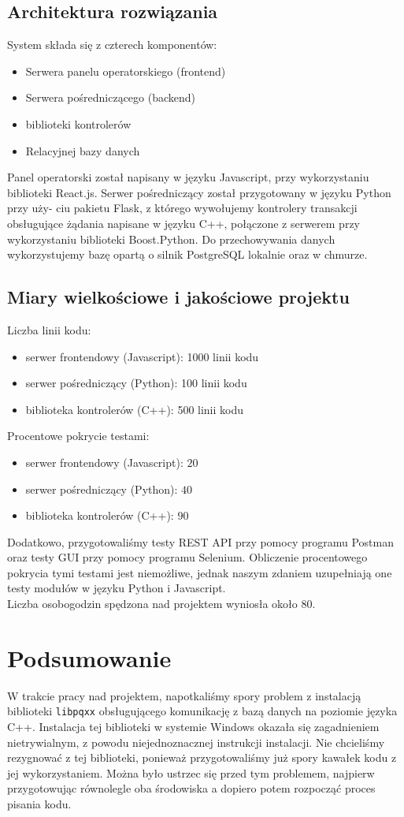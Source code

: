 \documentclass{article}
\begin{document}
\subsection{Architektura rozwiązania}
System składa się z czterech komponentów:
\begin{itemize}
\item Serwera panelu operatorskiego (frontend)
\item Serwera pośredniczącego (backend)
\item biblioteki kontrolerów 
\item Relacyjnej bazy danych
\end{itemize}
Panel operatorski został napisany w języku Javascript, przy wykorzystaniu
biblioteki React.js. Serwer pośredniczący został przygotowany w języku Python przy uży-
ciu pakietu Flask, z którego wywołujemy kontrolery transakcji obsługujące żądania
napisane w języku C++, połączone z serwerem przy wykorzystaniu biblioteki
Boost.Python. Do przechowywania danych wykorzystujemy bazę opartą o silnik PostgreSQL
lokalnie oraz w chmurze.

\subsection{Miary wielkościowe i jakościowe projektu}
Liczba linii kodu:
\begin{itemize}
    \item serwer frontendowy (Javascript): 1000 linii kodu
    \item serwer pośredniczący (Python): 100 linii kodu
    \item biblioteka kontrolerów (C++): 500 linii kodu
\end{itemize}

Procentowe pokrycie testami:
\begin{itemize}
    \item serwer frontendowy (Javascript): $20$ 
    \item serwer pośredniczący (Python): $40$ 
    \item biblioteka kontrolerów (C++): $90$ 
\end{itemize}
Dodatkowo, przygotowaliśmy testy REST API przy pomocy programu Postman oraz testy
GUI przy pomocy programu Selenium. Obliczenie procentowego pokrycia tymi testami 
jest niemożliwe, jednak naszym zdaniem uzupełniają one testy modułów w języku Python
i Javascript.\\

Liczba osobogodzin spędzona nad projektem wyniosła około 80.
\section{Podsumowanie}
W trakcie pracy nad projektem, napotkaliśmy spory problem z instalacją biblioteki \texttt{libpqxx}
obsługującego komunikację z bazą danych na poziomie języka C++. Instalacja tej biblioteki w systemie Windows
okazała się zagadnieniem nietrywialnym, z powodu niejednoznacznej instrukcji instalacji. Nie chcieliśmy 
rezygnować z tej biblioteki, ponieważ przygotowaliśmy już spory kawałek kodu z jej wykorzystaniem. Można było ustrzec się
przed tym problemem, najpierw przygotowując równolegle oba środowiska a dopiero potem rozpocząć
proces pisania kodu. 
\end{document}

